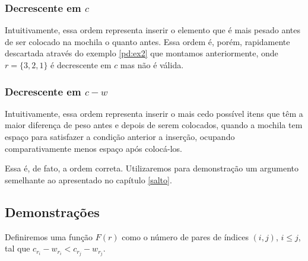 \subsubsection*{Decrescente em $c$}

Intuitivamente, essa ordem representa inserir o elemento que é mais pesado antes de ser colocado na mochila o quanto antes. Essa ordem é, porém, rapidamente descartada através do exemplo \ref{pd:ex2} que montamos anteriormente, onde $r = \{3, 2, 1\}$ é decrescente em $c$ mas não é válida.

\subsubsection*{Decrescente em $c - w$}

Intuitivamente, essa ordem representa inserir o mais cedo possível itens que têm a maior diferença de peso antes e depois de serem colocados,  quando a mochila tem espaço para satisfazer a condição anterior a inserção, ocupando comparativamente menos espaço após colocá-los.

Essa é, de fato, a ordem correta. Utilizaremos para demonstração um argumento semelhante ao apresentado no capítulo \ref{salto}.

\subsection*{Demonstrações}

Definiremos uma função $F(r)$ como o número de pares de índices $(i, j)$, $i \leq j$, tal que $c_{r_i} - w_{r_i} < c_{r_j} - w_{r_j}$.

